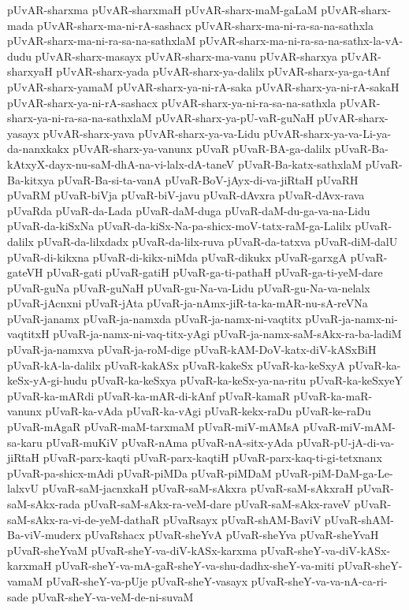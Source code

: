 {pUvAR-sharxma
pUvAR-sharxmaH
pUvAR-sharx-maM-gaLaM
pUvAR-sharx-mada
pUvAR-sharx-ma-ni-rA-sashacx
pUvAR-sharx-ma-ni-ra-sa-na-sathxla
pUvAR-sharx-ma-ni-ra-sa-na-sathxlaM
pUvAR-sharx-ma-ni-ra-sa-na-sathx-la-vA-dudu
pUvAR-sharx-masayx
pUvAR-sharx-ma-vanu
pUvAR-sharxya
pUvAR-sharxyaH
pUvAR-sharx-yada
pUvAR-sharx-ya-dalilx
pUvAR-sharx-ya-ga-tAnf
pUvAR-sharx-yamaM
pUvAR-sharx-ya-ni-rA-saka
pUvAR-sharx-ya-ni-rA-sakaH
pUvAR-sharx-ya-ni-rA-sashacx
pUvAR-sharx-ya-ni-ra-sa-na-sathxla
pUvAR-sharx-ya-ni-ra-sa-na-sathxlaM
pUvAR-sharx-ya-pU-vaR-guNaH
pUvAR-sharx-yasayx
pUvAR-sharx-yava
pUvAR-sharx-ya-va-Lidu
pUvAR-sharx-ya-va-Li-ya-da-nanxkakx
pUvAR-sharx-ya-vanunx
pUvaR
pUvaR-BA-ga-dalilx
pUvaR-Ba-kAtxyX-dayx-nu-saM-dhA-na-vi-lalx-dA-taneV
pUvaR-Ba-katx-sathxlaM
pUvaR-Ba-kitxya
pUvaR-Ba-si-ta-vanA
pUvaR-BoV-jAyx-di-va-jiRtaH
pUvaRH
pUvaRM
pUvaR-biVja
pUvaR-biV-javu
pUvaR-dAvxra
pUvaR-dAvx-rava
pUvaRda
pUvaR-da-Lada
pUvaR-daM-duga
pUvaR-daM-du-ga-va-na-Lidu
pUvaR-da-kiSxNa
pUvaR-da-kiSx-Na-pa-shicx-moV-tatx-raM-ga-Lalilx
pUvaR-dalilx
pUvaR-da-lilxdadx
pUvaR-da-lilx-ruva
pUvaR-da-tatxva
pUvaR-diM-dalU
pUvaR-di-kikxna
pUvaR-di-kikx-niMda
pUvaR-dikukx
pUvaR-garxgA
pUvaR-gateVH
pUvaR-gati
pUvaR-gatiH
pUvaR-ga-ti-pathaH
pUvaR-ga-ti-yeM-dare
pUvaR-guNa
pUvaR-guNaH
pUvaR-gu-Na-va-Lidu
pUvaR-gu-Na-va-nelalx
pUvaR-jAcnxni
pUvaR-jAta
pUvaR-ja-nAmx-jiR-ta-ka-mAR-nu-sA-reVNa
pUvaR-janamx
pUvaR-ja-namxda
pUvaR-ja-namx-ni-vaqtitx
pUvaR-ja-namx-ni-vaqtitxH
pUvaR-ja-namx-ni-vaq-titx-yAgi
pUvaR-ja-namx-saM-sAkx-ra-ba-ladiM
pUvaR-ja-namxva
pUvaR-ja-roM-dige
pUvaR-kAM-DoV-katx-diV-kASxBiH
pUvaR-kA-la-dalilx
pUvaR-kakASx
pUvaR-kakeSx
pUvaR-ka-keSxyA
pUvaR-ka-keSx-yA-gi-hudu
pUvaR-ka-keSxya
pUvaR-ka-keSx-ya-na-ritu
pUvaR-ka-keSxyeY
pUvaR-ka-mARdi
pUvaR-ka-mAR-di-kAnf
pUvaR-kamaR
pUvaR-ka-maR-vanunx
pUvaR-ka-vAda
pUvaR-ka-vAgi
pUvaR-kekx-raDu
pUvaR-ke-raDu
pUvaR-mAgaR
pUvaR-maM-tarxmaM
pUvaR-miV-mAMsA
pUvaR-miV-mAM-sa-karu
pUvaR-muKiV
pUvaR-nAma
pUvaR-nA-sitx-yAda
pUvaR-pU-jA-di-va-jiRtaH
pUvaR-parx-kaqti
pUvaR-parx-kaqtiH
pUvaR-parx-kaq-ti-gi-tetxnanx
pUvaR-pa-shicx-mAdi
pUvaR-piMDa
pUvaR-piMDaM
pUvaR-piM-DaM-ga-Le-lalxvU
pUvaR-saM-jacnxkaH
pUvaR-saM-sAkxra
pUvaR-saM-sAkxraH
pUvaR-saM-sAkx-rada
pUvaR-saM-sAkx-ra-veM-dare
pUvaR-saM-sAkx-raveV
pUvaR-saM-sAkx-ra-vi-de-yeM-dathaR
pUvaRsayx
pUvaR-shAM-BaviV
pUvaR-shAM-Ba-viV-muderx
pUvaRshacx
pUvaR-sheYvA
pUvaR-sheYva
pUvaR-sheYvaH
pUvaR-sheYvaM
pUvaR-sheY-va-diV-kASx-karxma
pUvaR-sheY-va-diV-kASx-karxmaH
pUvaR-sheY-va-mA-gaR-sheY-va-shu-dadhx-sheY-va-miti
pUvaR-sheY-vamaM
pUvaR-sheY-va-pUje
pUvaR-sheY-vasayx
pUvaR-sheY-va-va-nA-ca-ri-sade
pUvaR-sheY-va-veM-de-ni-suvaM
}
